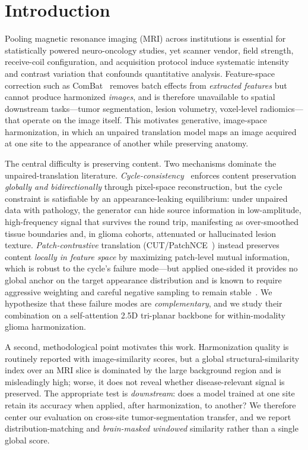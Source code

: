 \documentclass[runningheads]{llncs}
\begin{document}
\section{Introduction}
\label{sec:intro}
Pooling magnetic resonance imaging (MRI) across institutions is essential for
statistically powered neuro-oncology studies, yet scanner vendor, field strength,
receive-coil configuration, and acquisition protocol induce systematic intensity
and contrast variation that confounds quantitative analysis. Feature-space
correction such as ComBat~\cite{fortin2017combat} removes batch effects from
\emph{extracted features} but cannot produce harmonized \emph{images}, and is
therefore unavailable to spatial downstream tasks---tumor segmentation, lesion
volumetry, voxel-level radiomics---that operate on the image itself. This
motivates generative, image-space harmonization, in which an unpaired translation
model maps an image acquired at one site to the appearance of another while
preserving anatomy.

The central difficulty is preserving content. Two mechanisms dominate the
unpaired-translation literature. \emph{Cycle-consistency}~\cite{zhu2017cyclegan}
enforces content preservation \emph{globally and bidirectionally} through
pixel-space reconstruction, but the cycle constraint is satisfiable by an
appearance-leaking equilibrium: under unpaired data with pathology, the generator
can hide source information in low-amplitude, high-frequency signal that survives
the round trip, manifesting as over-smoothed tissue boundaries and, in glioma
cohorts, attenuated or hallucinated lesion texture. \emph{Patch-contrastive}
translation (CUT/PatchNCE~\cite{park2020cut}) instead preserves content
\emph{locally in feature space} by maximizing patch-level mutual information,
which is robust to the cycle's failure mode---but applied one-sided it provides
no global anchor on the target appearance distribution and is known to require
aggressive weighting and careful negative sampling to remain
stable~\cite{wang2021negcut,zhan2022monce}. We hypothesize that these failure
modes are \emph{complementary}, and we study their combination on a
self-attention 2.5D tri-planar backbone for within-modality glioma harmonization.

A second, methodological point motivates this work. Harmonization quality is
routinely reported with image-similarity scores, but a global structural-similarity
index over an MRI slice is dominated by the large background region and is
misleadingly high; worse, it does not reveal whether disease-relevant signal is
preserved. The appropriate test is \emph{downstream}: does a model trained at one
site retain its accuracy when applied, after harmonization, to another? We
therefore center our evaluation on cross-site tumor-segmentation transfer, and we
report distribution-matching and \emph{brain-masked windowed} similarity rather
than a single global score.
\end{document}
